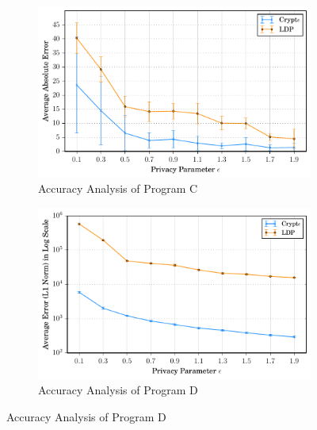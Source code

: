 \begin{figure}[ht]
\begin{subfigure}[b]{0.25\linewidth}
    \centering    \includegraphics[width=1\linewidth]{t7_final.pdf}
        \caption{Accuracy Analysis of Program C}
        \label{fig:P5}\end{subfigure}%
      \begin{subfigure}[b]{0.25\linewidth}
    \centering    \includegraphics[width=1\linewidth]{t3_final.pdf}
        \caption{Accuracy Analysis of Program D}
        \label{fig:P7}
    \end{subfigure}%
    

\end{figure}
